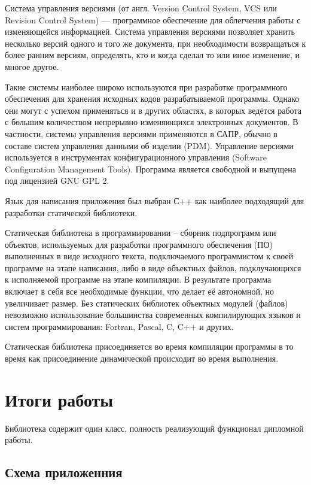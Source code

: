 Система управления версиями (от англ. Version Control System, VCS или Revision Control System) — программное обеспечение для облегчения работы с изменяющейся информацией. Система управления версиями позволяет хранить несколько версий одного и того же документа, при необходимости возвращаться к более ранним версиям, определять, кто и когда сделал то или иное изменение, и многое другое.

Такие системы наиболее широко используются при разработке программного обеспечения для хранения исходных кодов разрабатываемой программы. Однако они могут с успехом применяться и в других областях, в которых ведётся работа с большим количеством непрерывно изменяющихся электронных документов. В частности, системы управления версиями применяются в САПР, обычно в составе систем управления данными об изделии (PDM). Управление версиями используется в инструментах конфигурационного управления (Software Configuration Management Tools).
Программа является свободной и выпущена под лицензией GNU GPL 2.

Язык для написания приложения был выбран С++ как наиболее подходящий для разработки статической библиотеки.

Статическая библиотека в программировании -- сборник подпрограмм или объектов, используемых для разработки программного обеспечения (ПО) выполненных в виде исходного текста, подключаемого программистом к своей программе на этапе написания, либо в виде объектных файлов, подклучающихся к исполняемой программе на этапе компиляции. В результате программа включает в себя все необходимые функции, что делает её автономной, но увеличивает размер. Без статических библиотек объектных модулей (файлов) невозможно использование большинства современных компилирующих языков и систем программирования: Fortran, Pascal, C, C++ и других.

Статическая библиотека присоединяется во время компиляции программы в то время как присоединение динамической происходит во время выполнения.

\chapter{Итоги работы}
Библиотека содержит один класс, полность реализующий функционал дипломной работы.  
\section{Схема приложенния}
\begin{spacing}{0.9}

\end{spacing}

